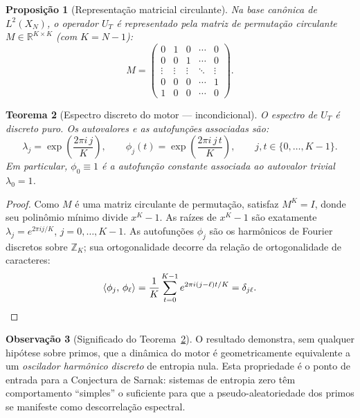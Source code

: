 \documentclass[12pt,a4paper]{article}
\newtheorem{theorem}{Teorema}[section]
\newtheorem{proposition}[theorem]{Proposição}
\theoremstyle{definition}
\newtheorem{remark}[theorem]{Observação}
\newcommand{\Z}{\mathbb{Z}}
\newcommand{\R}{\mathbb{R}}
\newcommand{\ip}[2]{\langle #1,\, #2 \rangle}
\begin{document}
	\begin{proposition}[Representação matricial circulante]
		\label{prop:circulante}
		Na base canônica de $L^2(X_N)$, o operador $U_T$ é representado
		pela matriz de permutação circulante
		$M \in \R^{K\times K}$ (com $K = N-1$):
		\[
		M = \begin{pmatrix}
			0 & 1 & 0 & \cdots & 0 \\
			0 & 0 & 1 & \cdots & 0 \\
			\vdots & \vdots & \vdots & \ddots & \vdots \\
			0 & 0 & 0 & \cdots & 1 \\
			1 & 0 & 0 & \cdots & 0
		\end{pmatrix}.
		\]
	\end{proposition}
	
	\begin{theorem}[Espectro discreto do motor — incondicional]
		\label{thm:espectro}
		O espectro de $U_T$ é discreto puro. Os autovalores e as
		autofunções associadas são:
		\[
		\lambda_j = \exp\!\left(\frac{2\pi i\, j}{K}\right),\qquad
		\phi_j(t) = \exp\!\left(\frac{2\pi i\, j\, t}{K}\right),\qquad
		j,t \in \{0,\ldots,K-1\}.
		\]
		Em particular, $\phi_0 \equiv 1$ é a autofunção constante
		associada ao autovalor trivial $\lambda_0 = 1$.
	\end{theorem}
	
	\begin{proof}
		Como $M$ é uma matriz circulante de permutação, satisfaz
		$M^K = I$, donde seu polinômio mínimo divide $x^K - 1$. As
		raízes de $x^K - 1$ são exatamente $\lambda_j = e^{2\pi ij/K}$,
		$j = 0,\ldots,K-1$. As autofunções $\phi_j$ são os harmônicos
		de Fourier discretos sobre $\Z_K$; sua ortogonalidade decorre
		da relação de ortogonalidade de caracteres:
		\[
		\ip{\phi_j}{\phi_\ell} = \frac{1}{K}\sum_{t=0}^{K-1}
		e^{2\pi i(j-\ell)t/K} = \delta_{j\ell}.\qedhere
		\]
	\end{proof}
	
	\begin{remark}[Significado do Teorema~\ref{thm:espectro}]
		O resultado demonstra, sem qualquer hipótese sobre primos, que
		a dinâmica do motor é geometricamente equivalente a um
		\emph{oscilador harmônico discreto} de entropia nula. Esta
		propriedade é o ponto de entrada para a Conjectura de Sarnak:
		sistemas de entropia zero têm comportamento ``simples'' o
		suficiente para que a pseudo-aleatoriedade dos primos se
		manifeste como descorrelação espectral.
	\end{remark}
	
\end{document}
